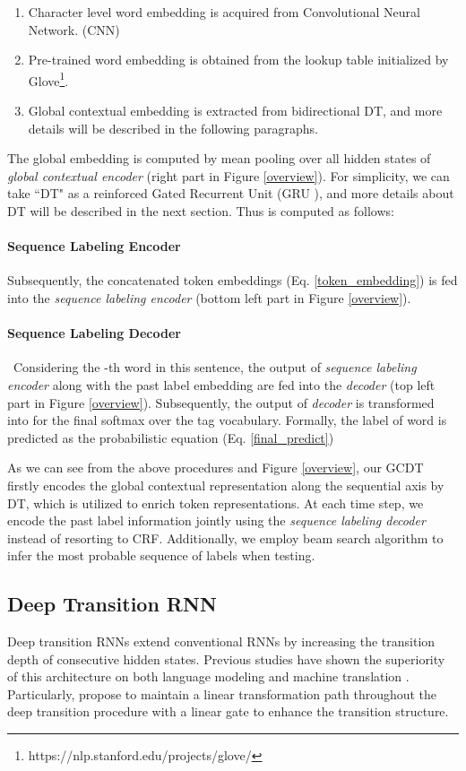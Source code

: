 \documentclass[11pt,a4paper]{article}
\begin{document}
\begin{enumerate}
\item Character level word embedding  is acquired from Convolutional Neural Network. (CNN) \cite{first_CNN}
\item Pre-trained word embedding  is obtained from the lookup table initialized by Glove\footnote{https://nlp.stanford.edu/projects/glove/}.
\item Global contextual embedding  is extracted from bidirectional DT, and more details will be described in the following paragraphs.
\end{enumerate}
The global embedding  is computed by mean pooling over all hidden states  of \emph{global contextual encoder} (right part in Figure \ref{overview}). For simplicity, we can take ``DT" as a reinforced Gated Recurrent Unit (GRU \citealp{GRU}), and more details about DT will be described in the next section. Thus  is computed as follows:


\paragraph{Sequence Labeling Encoder}
Subsequently, the concatenated token embeddings  (Eq. \ref{token_embedding}) is fed into the \emph{sequence labeling encoder} (bottom left part in Figure \ref{overview}).


\paragraph{Sequence Labeling Decoder} 
\ Considering the -th word in this sentence, the output of \emph{sequence labeling encoder}  along with the past label embedding  are fed into the \emph{decoder} (top left part in Figure \ref{overview}). Subsequently, 
the output of \emph{decoder}  is transformed into  for the final softmax over the tag vocabulary. Formally, the label of word  is predicted as the probabilistic equation (Eq. \ref{final_predict})

As we can see from the above procedures and Figure \ref{overview}, our GCDT firstly encodes the global contextual representation along the sequential axis by DT, which is utilized to enrich token representations.
At each time step, we encode the past label information jointly using the \emph{sequence labeling decoder} instead of resorting to CRF.
Additionally, we employ beam search algorithm to infer the most probable sequence of labels when testing.

\subsection{Deep Transition RNN}
Deep transition RNNs extend conventional RNNs by increasing the transition depth of consecutive hidden states. Previous studies have shown the superiority of this architecture on both language modeling \cite{DT_language_model} and machine translation \cite{DT_machine_translation,DTMT}. Particularly, \citeauthor{DTMT}  propose to maintain a linear transformation path throughout the deep transition procedure with a linear gate to enhance the transition structure.
\end{document}
